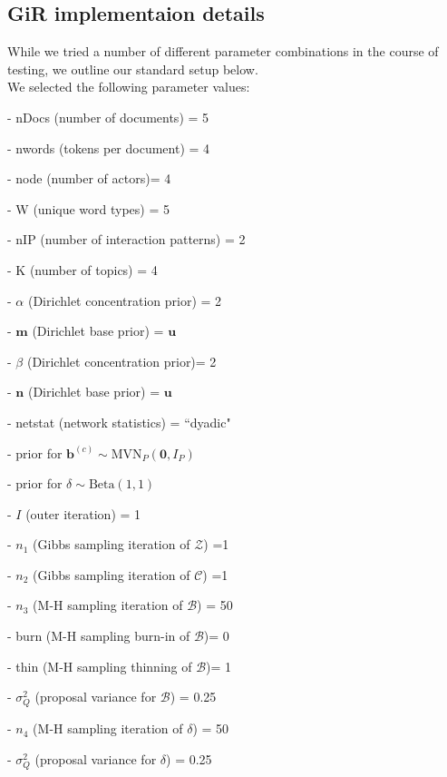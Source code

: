 \documentclass[a4paper]{article}
\begin{document}
   \subsection{GiR implementaion details} \label{subsubsec: GiR implementation}
   While we tried a number of different parameter combinations in the course of testing, we outline our standard setup below.\\ \newline
   We selected the following parameter values:
   \begin{itemize}
   	\begin{minipage}{0.5\textwidth}
   		\item[-] nDocs (number of documents) = 5
   		\item[-] nwords (tokens per document) = 4
   		\item[-] node (number of actors)= 4
   		\item[-] W (unique word types) = 5
   		\item[-] nIP (number of interaction patterns) = 2
   		\item[-] K (number of topics) = 4
   		\item[-] $\alpha$ (Dirichlet concentration prior) = 2
   		\item[-] $\boldsymbol{m}$ (Dirichlet base prior) = $\boldsymbol{u}$ 
   		\item[-] $\beta$ (Dirichlet concentration prior)= 2
   		\item[-] $\boldsymbol{n}$ (Dirichlet base prior) = $\boldsymbol{u}$
   		\item[-] netstat (network statistics) = ``dyadic"
   	\end{minipage}
   	\begin{minipage}{0.5\textwidth}
   		\item[-] prior for $\boldsymbol{b}^{(c)}\sim \mbox{MVN}_P(\boldsymbol{0}, I_P)$
   		\item[-] prior for $\delta\sim \mbox{Beta}(1, 1)$
   		\item[-] $I$ (outer iteration) = 1
   		\item[-] $n_1$ (Gibbs sampling iteration of $\mathcal{Z}$) =1 
   		\item[-] $n_2$ (Gibbs sampling iteration of $\mathcal{C}$) =1 
   		\item[-] $n_3$ (M-H sampling iteration of $\mathcal{B}$) = 50
   		\item[-] burn (M-H sampling burn-in of $\mathcal{B}$)= 0
   		\item[-] thin (M-H sampling thinning of $\mathcal{B}$)= 1
   		\item[-] $\sigma_Q^2$ (proposal variance for $\mathcal{B}$) = 0.25
   		\item[-] $n_4$ (M-H sampling iteration of $\delta$) = 50
   		\item[-] $\sigma_Q^2$ (proposal variance for $\delta$) = 0.25   		
   	\end{minipage}
   \end{itemize}
\end{document}
